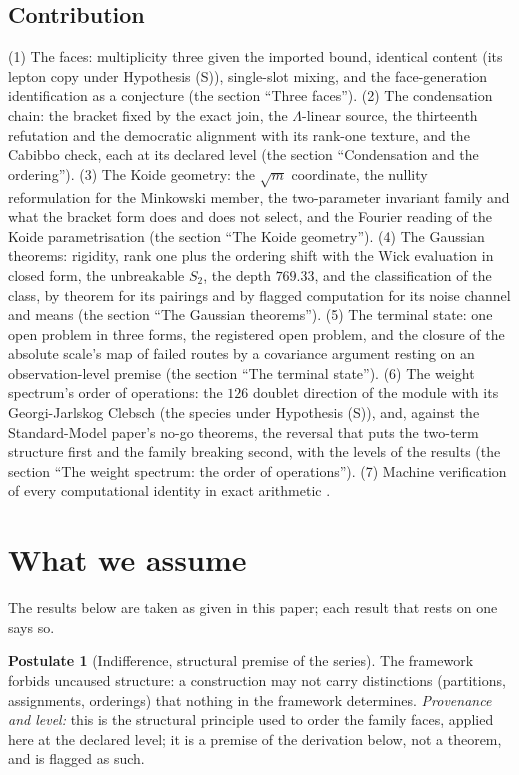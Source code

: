 \documentclass[11pt]{article}
\theoremstyle{definition}
\newtheorem{postulate}[theorem]{Postulate}
\theoremstyle{plain}
\begin{document}
\subsection*{Contribution}
\label{c:note.families.setting-contribution}
(1) The faces: multiplicity three given the imported bound, identical content (its lepton copy under Hypothesis (S)), single-slot mixing, and the face-generation identification as a conjecture (the section ``Three faces''). (2) The condensation chain: the bracket fixed by the exact join, the $\Lambda$-linear source, the thirteenth refutation and the democratic alignment with its rank-one texture, and the Cabibbo check, each at its declared level (the section ``Condensation and the ordering''). (3) The Koide geometry: the $\sqrt{m}$ coordinate, the nullity reformulation for the Minkowski member, the two-parameter invariant family and what the bracket form does and does not select, and the Fourier reading of the Koide parametrisation (the section ``The Koide geometry''). (4) The Gaussian theorems: rigidity, rank one plus the ordering shift with the Wick evaluation in closed form, the unbreakable $S_{2}$, the depth $769.33$, and the classification of the class, by theorem for its pairings and by flagged computation for its noise channel and means (the section ``The Gaussian theorems''). (5) The terminal state: one open problem in three forms, the registered open problem, and the closure of the absolute scale's map of failed routes by a covariance argument resting on an observation-level premise (the section ``The terminal state''). (6) The weight spectrum's order of operations: the $126$ doublet direction of the module with its Georgi-Jarlskog Clebsch (the species under Hypothesis (S)), and, against the Standard-Model paper's no-go theorems, the reversal that puts the two-term structure first and the family breaking second, with the levels of the results (the section ``The weight spectrum: the order of operations''). (7) Machine verification of every computational identity in exact arithmetic \cite{ButlerVerifyT13}.

\section*{What we assume}
The results below are taken as given in this paper; each result that rests on one says so.
\begin{postulate}[Indifference, structural premise of the series]\label{c:scrambling.indifference-structural-premise-series}
The framework forbids uncaused structure: a construction may not carry distinctions (partitions, assignments, orderings) that nothing in the framework determines. \emph{Provenance and level:} this is the structural principle used to order the family faces, applied here at the declared level; it is a premise of the derivation below, not a theorem, and is flagged as such.
\end{postulate}
\end{document}
